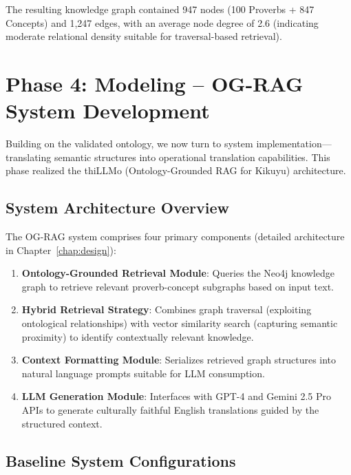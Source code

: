 The resulting knowledge graph contained 947 nodes (100 Proverbs + 847 Concepts) and 1,247 edges, with an average node degree of 2.6 (indicating moderate relational density suitable for traversal-based retrieval).

\section{Phase 4: Modeling -- OG-RAG System Development}
\label{sec:phase_modeling}

Building on the validated ontology, we now turn to system implementation—translating semantic structures into operational translation capabilities. This phase realized the thiLLMo (Ontology-Grounded RAG for Kikuyu) architecture.

\subsection{System Architecture Overview}
\label{subsec:system_architecture}

The OG-RAG system comprises four primary components (detailed architecture in Chapter~\ref{chap:design}):

\begin{enumerate}
    \item \textbf{Ontology-Grounded Retrieval Module}: Queries the Neo4j knowledge graph to retrieve relevant proverb-concept subgraphs based on input text.
    
    \item \textbf{Hybrid Retrieval Strategy}: Combines graph traversal (exploiting ontological relationships) with vector similarity search (capturing semantic proximity) to identify contextually relevant knowledge.
    
    \item \textbf{Context Formatting Module}: Serializes retrieved graph structures into natural language prompts suitable for LLM consumption.
    
    \item \textbf{LLM Generation Module}: Interfaces with GPT-4 and Gemini 2.5 Pro APIs to generate culturally faithful English translations guided by the structured context.
\end{enumerate}

\subsection{Baseline System Configurations}
\label{subsec:baseline_configs}

